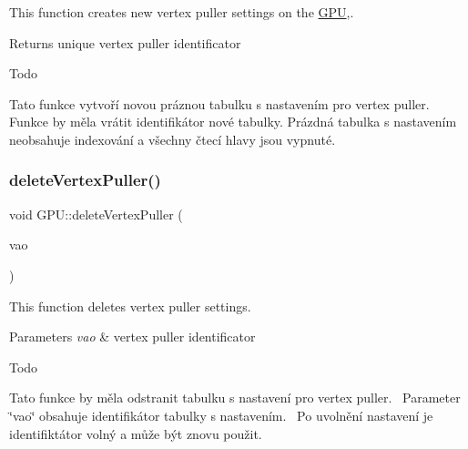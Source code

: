 This function creates new vertex puller settings on the \hyperlink{classGPU}{G\+PU},. 

\begin{DoxyReturn}{Returns}
unique vertex puller identificator 
\end{DoxyReturn}
\begin{DoxyRefDesc}{Todo}
\item[\hyperlink{todo__todo000008}{Todo}]Tato funkce vytvoří novou práznou tabulku s nastavením pro vertex puller.~\newline
 Funkce by měla vrátit identifikátor nové tabulky. Prázdná tabulka s nastavením neobsahuje indexování a všechny čtecí hlavy jsou vypnuté. \end{DoxyRefDesc}
\mbox{\label{group__vertexpuller__tasks_gadf91a9fec77d8d23f093458b36a733fc}} 
\subsubsection{\texorpdfstring{delete\+Vertex\+Puller()}{deleteVertexPuller()}}
{\footnotesize\ttfamily void G\+P\+U\+::delete\+Vertex\+Puller (\begin{DoxyParamCaption}\item[{\hyperlink{fwd_8hpp_af6f78f73099477c9ce5537d657597486}{Vertex\+Puller\+ID}}]{vao }\end{DoxyParamCaption})}



This function deletes vertex puller settings. 


\begin{DoxyParams}{Parameters}
{\em vao} & vertex puller identificator \\
\hline
\end{DoxyParams}
\begin{DoxyRefDesc}{Todo}
\item[\hyperlink{todo__todo000009}{Todo}]Tato funkce by měla odstranit tabulku s nastavení pro vertex puller.~\newline
 Parameter \char`\"{}vao\char`\"{} obsahuje identifikátor tabulky s nastavením.~\newline
 Po uvolnění nastavení je identifiktátor volný a může být znovu použit.~\newline
 \end{DoxyRefDesc}
\mbox{\label{group__vertexpuller__tasks_gae95cab56d80cb888e71b25965dc868c5}} 
